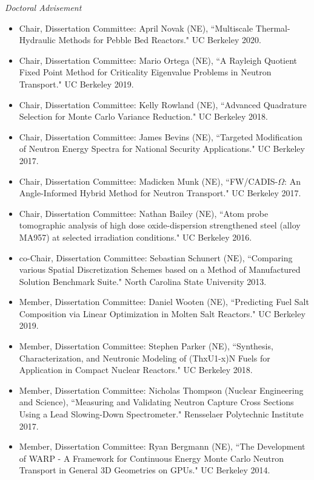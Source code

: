 \textit{Doctoral Advisement}
\begin{itemize}
\item Chair, Dissertation Committee: April Novak (NE), ``Multiscale
Thermal-Hydraulic Methods for Pebble Bed Reactors." UC Berkeley 2020.
%
\item Chair, Dissertation Committee: Mario Ortega (NE), ``A Rayleigh Quotient Fixed Point Method for Criticality Eigenvalue Problems in Neutron Transport."  UC Berkeley 2019.
%
\item Chair, Dissertation Committee: Kelly Rowland (NE), ``Advanced Quadrature Selection for Monte Carlo Variance Reduction."  UC Berkeley 2018.
%
\item Chair, Dissertation Committee: James Bevins (NE), ``Targeted Modification of Neutron Energy Spectra for National Security Applications."  UC Berkeley 2017.
%
\item Chair, Dissertation Committee: Madicken Munk (NE), ``FW/CADIS-$\Omega$: An Angle-Informed Hybrid Method for Neutron Transport."  UC Berkeley 2017.
%
\item Chair, Dissertation Committee: Nathan Bailey (NE), ``Atom probe tomographic analysis of high dose oxide-dispersion strengthened steel (alloy MA957) at selected irradiation conditions."  UC Berkeley 2016.
%
\item co-Chair, Dissertation Committee: Sebastian Schunert (NE), ``Comparing various Spatial Discretization Schemes based on a Method of Manufactured Solution Benchmark Suite." North Carolina State University 2013.
%
\item Member, Dissertation Committee: Daniel Wooten (NE), ``Predicting Fuel Salt Composition via Linear Optimization in Molten Salt
Reactors."  UC Berkeley 2019.
%
\item Member, Dissertation Committee: Stephen Parker (NE), ``Synthesis, Characterization, and Neutronic Modeling of (ThxU1-x)N Fuels for Application in Compact Nuclear Reactors."  UC Berkeley 2018.
%
\item Member, Dissertation Committee: Nicholas Thompson (Nuclear Engineering and Science), ``Measuring and Validating Neutron Capture Cross Sections Using a Lead Slowing-Down Spectrometer."  Rensselaer Polytechnic Institute 2017.
%
\item Member, Dissertation Committee: Ryan Bergmann (NE), ``The Development of WARP - A Framework for Continuous Energy Monte Carlo Neutron Transport in General 3D Geometries on GPUs."  UC Berkeley 2014.
\end{itemize}

